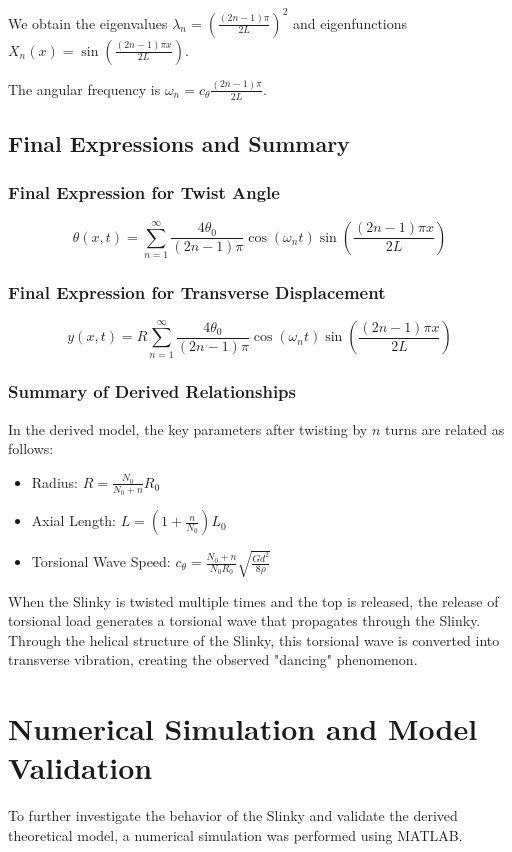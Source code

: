 \documentclass{mcmthesis}  %
\begin{document}
We obtain the eigenvalues \(\lambda_n = \left(\frac{(2n-1)\pi}{2L}\right)^2\) and eigenfunctions \(X_n(x) = \sin\left(\frac{(2n-1)\pi x}{2L}\right)\).

The angular frequency is \(\omega_n = c_{\theta} \frac{(2n-1)\pi}{2L}\).

\subsection{Final Expressions and Summary}

\subsubsection{Final Expression for Twist Angle}
\[ \theta(x,t) = \sum_{n=1}^{\infty} \frac{4\theta_0}{(2n-1)\pi} \cos(\omega_n t) \sin\left(\frac{(2n-1)\pi x}{2L}\right) \]

\subsubsection{Final Expression for Transverse Displacement}
\[ y(x,t) = R \sum_{n=1}^{\infty} \frac{4\theta_0}{(2n-1)\pi} \cos(\omega_n t) \sin\left(\frac{(2n-1)\pi x}{2L}\right) \]

\subsubsection{Summary of Derived Relationships}
In the derived model, the key parameters after twisting by \(n\) turns are related as follows:
\begin{itemize}
    \item Radius: \(R = \frac{N_0}{N_0+n} R_0\)
    \item Axial Length: \(L = \left(1 + \frac{n}{N_0}\right) L_0\)
    \item Torsional Wave Speed: \(c_{\theta} = \frac{N_0+n}{N_0 R_0} \sqrt{\frac{G d^2}{8 \rho}}\) 
\end{itemize}

When the Slinky is twisted multiple times and the top is released, the release of torsional load generates a torsional wave that propagates through the Slinky. Through the helical structure of the Slinky, this torsional wave is converted into transverse vibration, creating the observed "dancing" phenomenon.

\section{Numerical Simulation and Model Validation}
To further investigate the behavior of the Slinky and validate the derived theoretical model, a numerical simulation was performed using MATLAB.
\end{document}
